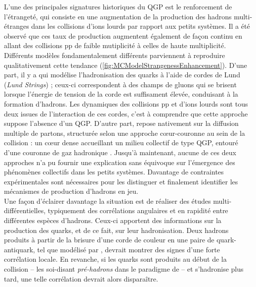 L'une des principales signatures historiques du QGP est le renforcement de l'étrangeté, qui consiste en une augmentation de la production des hadrons multi-étranges dans les collisions d'ions lourds par rapport aux petits systèmes. Il a été observé que ces taux de production augmentent également de façon continu en allant des collisions pp de faible mutiplicité à celles de haute multiplicité. Différents modèles fondamentalement différents parviennent à reproduire qualitativement cette tendance (\fig\ref{fig:MCModelStrangenessEnhancement}). D'une part, il y a \Pythia \cite{bierlichComprehensiveGuidePhysics2022, skandsTuningPYTHIAMonash2014} qui modélise l'hadronisation des quarks à l'aide de cordes de Lund (\textit{Lund Strings}) ; ceux-ci correspondent à des champs de gluons qui se brisent lorsque l'énergie de tension de la corde est suffisament élevée, conduisant à la formation d'hadrons. Les dynamiques des collisions pp et d'ions lourds sont tous deux issues de l'interaction de ces cordes, c'est à comprendre que cette approche suppose l'absence d'un QGP. D'autre part, \Epos \cite{wernerCorecoronaProcedureMicrocanonical2023} repose nativement sur la diffusion multiple de partons, structurée selon une approche c\oe{}ur-couronne au sein de la collision : un c\oe{}ur dense accueillant un milieu collectif de type QGP, entouré d'une couronne de gaz hadronique \cite{wernerAnalysingRadialFlow2014}. Jusqu'à maintenant, aucune de ces deux approches n'a pu fournir une explication sans équivoque sur l'émergence des phénomènes collectifs dans les petits systèmes. Davantage de contraintes expérimentales sont nécessaires pour les distinguer et finalement identifier les mécanismes de production d'hadrons en jeu. \\

Une façon d'éclairer davantage la situation est de réaliser des études multi-différentielles, typiquement des corrélations angulaires et en rapidité entre différentes espèces d'hadrons. Ceux-ci apportent des informations sur la production des quarks, et de ce fait, sur leur hadronisation. Deux hadrons produits à partir de la brisure d'une corde de couleur en une paire de quark-antiquark, tel que modélisé par \Pythia, devrait montrer des signes d'une forte corrélation locale. En revanche, si les quarks sont produits au début de la collision -- les soi-disant \textit{pré-hadrons} dans le paradigme de \Epos \cite{wernerCorecoronaProcedureMicrocanonical2023} -- et s'hadronise plus tard, une telle corrélation devrait alors disparaître.

